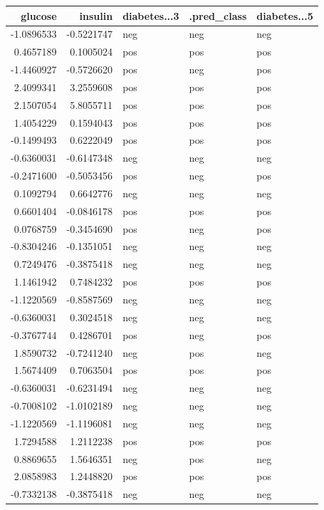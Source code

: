 \documentclass[
]{book}
\begin{document}
\begin{tabular}{r|r|l|l|l}
\hline
glucose & insulin & diabetes...3 & .pred\_class & diabetes...5\\
\hline
-1.0896533 & -0.5221747 & neg & neg & neg\\
\hline
0.4657189 & 0.1005024 & pos & pos & pos\\
\hline
-1.4460927 & -0.5726620 & pos & neg & pos\\
\hline
2.4099341 & 3.2559608 & pos & pos & pos\\
\hline
2.1507054 & 5.8055711 & pos & pos & pos\\
\hline
1.4054229 & 0.1594043 & pos & pos & pos\\
\hline
-0.1499493 & 0.6222049 & pos & pos & pos\\
\hline
-0.6360031 & -0.6147348 & neg & neg & neg\\
\hline
-0.2471600 & -0.5053456 & pos & neg & pos\\
\hline
0.1092794 & 0.6642776 & neg & neg & neg\\
\hline
0.6601404 & -0.0846178 & pos & pos & pos\\
\hline
0.0768759 & -0.3454690 & pos & neg & pos\\
\hline
-0.8304246 & -0.1351051 & neg & neg & neg\\
\hline
0.7249476 & -0.3875418 & neg & neg & neg\\
\hline
1.1461942 & 0.7484232 & pos & pos & pos\\
\hline
-1.1220569 & -0.8587569 & neg & neg & neg\\
\hline
-0.6360031 & 0.3024518 & neg & neg & neg\\
\hline
-0.3767744 & 0.4286701 & pos & neg & pos\\
\hline
1.8590732 & -0.7241240 & neg & pos & neg\\
\hline
1.5674409 & 0.7063504 & pos & pos & pos\\
\hline
-0.6360031 & -0.6231494 & neg & neg & neg\\
\hline
-0.7008102 & -1.0102189 & neg & neg & neg\\
\hline
-1.1220569 & -1.1196081 & neg & neg & neg\\
\hline
1.7294588 & 1.2112238 & pos & pos & pos\\
\hline
0.8869655 & 1.5646351 & neg & pos & neg\\
\hline
2.0858983 & 1.2448820 & pos & pos & pos\\
\hline
-0.7332138 & -0.3875418 & neg & neg & neg\\

\end{tabular}
\end{document}
